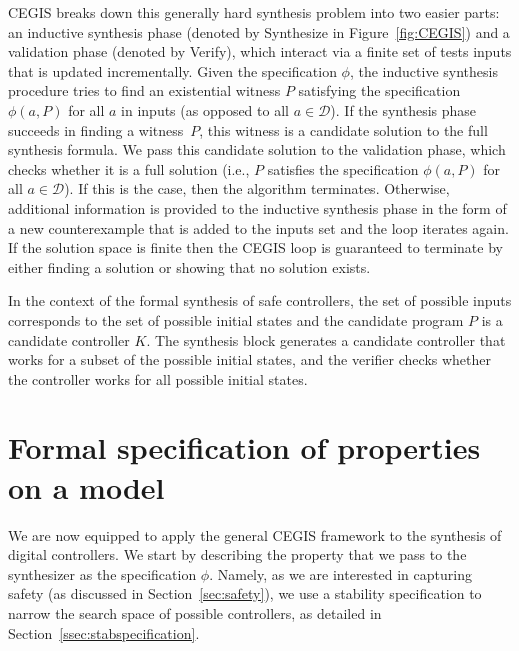 \documentclass[twocolumn]{autart}    %
\begin{document}
CEGIS breaks down this generally hard synthesis problem into two easier parts:
an inductive synthesis phase (denoted by {\sc Synthesize} in
Figure~\ref{fig:CEGIS}) and a validation phase (denoted by {\sc
  Verify}), which interact via a finite set of tests {\sc
  inputs} that is updated incrementally.
Given the specification $\phi$, the inductive synthesis procedure tries to
find an existential witness $P$ satisfying the specification
$\phi(a, P)$ for all $a$ in {\sc inputs} (as opposed to all $a \in
\mathcal{D}$).
%
If the synthesis phase succeeds in finding a witness~$P$, this witness is a
candidate solution to the full synthesis formula.  We pass this candidate
solution to the validation phase, which checks whether it is a full solution
(i.e., $P$ satisfies the specification $\phi(a, P)$ for all
$a\in\mathcal{D}$).  If this is the case, then the algorithm terminates. 
Otherwise, additional information is provided to the inductive synthesis
phase in the form of a new counterexample that is added to the {\sc inputs}
set and the loop iterates again.  %
If the solution space is finite then the CEGIS loop is guaranteed to
terminate by either finding a solution or showing that no solution
exists.

In the context of the formal synthesis of safe controllers, 
the set of possible {\sc inputs} corresponds to the set of possible initial states and the 
candidate program $P$ is a candidate controller $K$. The synthesis block generates a candidate
controller that works for a subset of the possible initial states, and the verifier checks whether 
the controller works for all possible initial states. 

\section{Formal specification of properties on a model} 
\label{sec:specification}

We are now equipped to apply the general CEGIS framework to the synthesis of digital controllers. 
We start by describing the property that we pass to the synthesizer as the specification $\phi$. 
Namely, as we are interested in capturing safety (as discussed in Section~\ref{sec:safety}),  
we use a stability specification to narrow the search space of possible controllers, as detailed in Section~\ref{ssec:stabspecification}.
\end{document}
